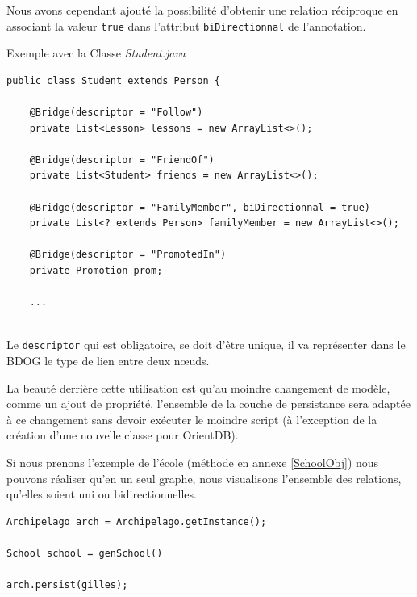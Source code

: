 \documentclass[a4paper,fleqn,12pt]{report}
\begin{document}
Nous avons cependant ajouté la possibilité d'obtenir une relation réciproque en associant la valeur \texttt{true} dans l'attribut \texttt{biDirectionnal} de l'annotation. 

Exemple avec la Classe \textit{Student.java}

\begin{lstlisting}
public class Student extends Person {

    @Bridge(descriptor = "Follow")
    private List<Lesson> lessons = new ArrayList<>();
    
    @Bridge(descriptor = "FriendOf")
    private List<Student> friends = new ArrayList<>();
    
    @Bridge(descriptor = "FamilyMember", biDirectionnal = true)
    private List<? extends Person> familyMember = new ArrayList<>();
    
    @Bridge(descriptor = "PromotedIn")
    private Promotion prom;
    
    ...
    
\end{lstlisting}

Le \texttt{descriptor} qui est obligatoire, se doit d'être unique, il va représenter dans le BDOG le type de lien entre deux nœuds.

La beauté derrière cette utilisation est qu'au moindre changement de modèle, comme un ajout de propriété, l'ensemble de la couche de persistance sera adaptée à ce changement sans devoir exécuter le moindre script (à l'exception de la création d'une nouvelle classe pour OrientDB).

Si nous prenons l'exemple de l'école (méthode en annexe \ref{SchoolObj}) nous pouvons réaliser qu'en un seul graphe, nous visualisons l'ensemble des relations, qu'elles soient uni ou bidirectionnelles.

\begin{lstlisting}
Archipelago arch = Archipelago.getInstance();

School school = genSchool()

arch.persist(gilles);
\end{lstlisting}
\end{document}
